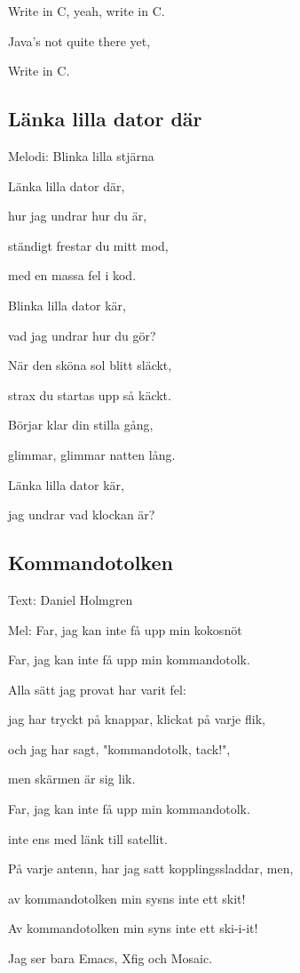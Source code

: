 Write in C, yeah, write in C.

Java's not quite there yet,

Write in C. \bigskip

\subsection{\textbf{Länka lilla dator där}}

Melodi: Blinka lilla stjärna


Länka lilla dator där,

hur jag undrar hur du är,

ständigt frestar du mitt mod,

med en massa fel i kod.

Blinka lilla dator kär,

vad jag undrar hur du gör?\bigskip

När den sköna sol blitt släckt,

strax du startas upp så käckt.

Börjar klar din stilla gång,

glimmar, glimmar natten lång.

Länka lilla dator kär,

jag undrar vad klockan är?

\subsection{\textbf{Kommandotolken}}

Text: Daniel Holmgren

Mel: Far, jag kan inte få upp min kokosnöt

Far, jag kan inte få upp min kommandotolk.

Alla sätt jag provat har varit fel:

jag har tryckt på knappar, klickat på varje flik,

och jag har sagt, "kommandotolk, tack!",

men skärmen är sig lik.\bigskip

Far, jag kan inte få upp min kommandotolk.

inte ens med länk till satellit.

På varje antenn, har jag satt kopplingssladdar, 
men,

av kommandotolken min sysns inte ett skit!\bigskip

Av kommandotolken min syns inte ett ski-i-it!

Jag ser bara Emacs, Xfig och Mosaic.

